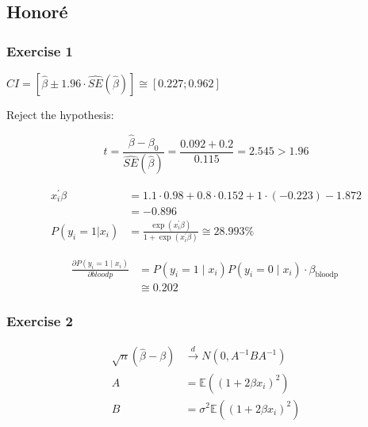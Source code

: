 \newpage
{
\subsection*{Honor\'e}

{
\subsubsection*{Exercise 1}

\begin{enumerate}[label=(\alph*)]
{\item 
$C I=[\hat{\beta} \pm 1.96 \cdot \hat{SE}(\hat{\beta})] \cong[0.227 ; 0.962]$
}
{\item 
Reject the hypothesis:

$$t=\frac{\hat{\beta}-\beta_{0}}{\hat{SE}(\hat{\beta})}=\frac{0.092+0.2}{0.115}=2.545>1.96$$
}
{\item 
$$
\begin{aligned}
x_{i}^{\prime} \beta & =1.1 \cdot 0.98+0.8 \cdot 0.152+1 \cdot(-0.223)-1.872 \\
& =-0.896 \\
P\left(y_{i} =1 | x_{i}\right)&=\frac{\exp \left(x_{i}^{\prime} \beta\right)}{1+\exp \left(x_{i}^\prime \beta\right)} \cong 28.993 \%
\end{aligned}
$$
}
{\item 
$$
\begin{aligned}
\frac{\partial P\left(y_{i}=1 \mid x_{i}\right)}{\partial b l o o d p} & =P\left(y_{i}=1 \mid x_{i}\right) P\left(y_{i}=0 \mid x_{i}\right) \cdot \beta_{\text {bloodp }} \\
& \cong 0.202
\end{aligned}
$$
}
\end{enumerate}
}
{
\subsubsection*{Exercise 2}

\begin{enumerate}[label=(\arabic*)]
{\item 
$$
\begin{aligned}
\sqrt{n}(\hat{\beta}-\beta) &\xrightarrow{d} N\left(0, A^{-1} B A^{-1}\right) \\
A &=\mathbb{E}\left(\left(1+2 \beta x_{i}\right)^{2}\right)\\
B &=\sigma^{2} \mathbb{E}\left(\left(1+2 \beta x_{i}\right)^{2}\right)
\end{aligned}
$$

}
\end{enumerate}}}
